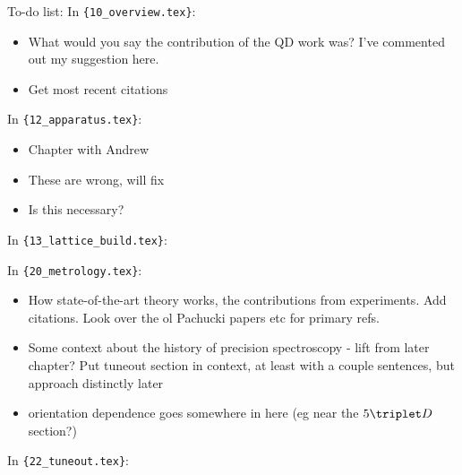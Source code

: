 To-do list:\newline
In \verb|{10_overview.tex}|:
\begin{itemize}
\item {What would you say the contribution of the QD work was? I've commented out my suggestion here.}
\item {Get most recent citations}
\end{itemize}
In \verb|{12_apparatus.tex}|:
\begin{itemize}
\item {Chapter with Andrew}
\item {These are wrong, will fix}
\item {Is this necessary?}
\end{itemize}
In \verb|{13_lattice_build.tex}|:
\begin{itemize}
\item {Include \href{https://www.nature.com/articles/s41586-021-03582-4}
\item {Get coil specs}
\end{itemize}
In \verb|{20_metrology.tex}|:
\begin{itemize}
\item {How state-of-the-art theory works, the contributions from experiments. Add citations. Look over the ol Pachucki papers etc for primary refs. }
\item {Some context about the history of precision spectroscopy - lift from later chapter? Put tuneout section in context, at least with a couple sentences, but approach distinctly later}
\item {orientation dependence goes somewhere in here (eg near the $5\triplet D$ section?)}
\end{itemize}
In \verb|{22_tuneout.tex}|:
